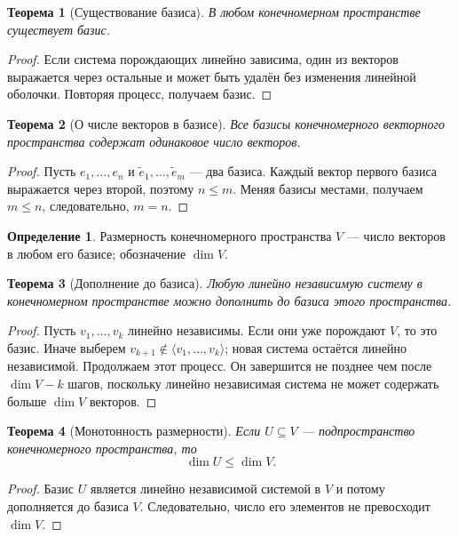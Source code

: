 \documentclass[12pt,a4paper,oneside,openany]{book}
\theoremstyle{definition}
\newtheorem{definition}{Определение}[chapter]
\theoremstyle{plain}
\newtheorem{theorem}{Теорема}[chapter]
\theoremstyle{remark}
\begin{document}
\begin{theorem}[Существование базиса]
В любом конечномерном пространстве существует базис.
\end{theorem}

\begin{proof}
Если система порождающих линейно зависима, один из векторов выражается
через остальные и может быть удалён без изменения линейной оболочки.
Повторяя процесс, получаем базис.
\end{proof}

\begin{theorem}[О числе векторов в базисе]
Все базисы конечномерного векторного пространства содержат одинаковое
число векторов.
\end{theorem}


\begin{proof}
Пусть $e_1,\ldots,e_n$ и $\widetilde e_1,\ldots,\widetilde e_m$ --- два
базиса. Каждый вектор первого базиса выражается через второй, поэтому
$n\leq m$. Меняя базисы местами, получаем $m\leq n$, следовательно,
$m=n$.
\end{proof}

\begin{definition}
Размерность конечномерного пространства $V$ --- число векторов в любом
его базисе; обозначение $\dim V$.
\end{definition}

\begin{theorem}[Дополнение до базиса]
Любую линейно независимую систему в конечномерном пространстве можно
дополнить до базиса этого пространства.
\end{theorem}

\begin{proof}
Пусть $v_1,\ldots,v_k$ линейно независимы. Если они уже порождают $V$,
то это базис. Иначе выберем
$v_{k+1}\notin\langle v_1,\ldots,v_k\rangle$; новая система остаётся
линейно независимой. Продолжаем этот процесс. Он завершится не позднее
чем после $\dim V-k$ шагов, поскольку линейно независимая система не
может содержать больше $\dim V$ векторов.
\end{proof}

\begin{theorem}[Монотонность размерности]
Если $U\subseteq V$ --- подпространство конечномерного пространства, то
\[
  \dim U\leq\dim V.
\]
\end{theorem}

\begin{proof}
Базис $U$ является линейно независимой системой в $V$ и потому
дополняется до базиса $V$. Следовательно, число его элементов не
превосходит $\dim V$.
\end{proof}
\end{document}
